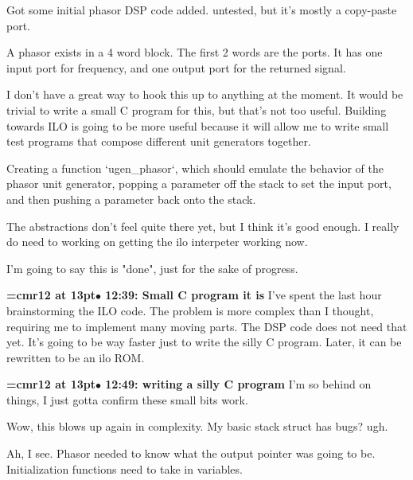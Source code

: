 Got some initial phasor DSP code added. untested, but it's mostly a copy-paste port.
\par

A phasor exists in a 4 word block. The first 2 words are the ports. It has one input port for frequency, and one output port for the returned signal.
\par

I don't have a great way to hook this up to anything at the moment. It would be trivial to write a small C program for this, but that's not too useful. Building towards ILO is going to be more useful because it will allow me to write small test programs that compose different unit generators together.
\par

Creating a function `ugen\_phasor`, which should emulate the behavior of the phasor unit generator, popping a parameter off the stack to set the input port, and then pushing a parameter back onto the stack.
\par

The abstractions don't feel quite there yet, but I think it's good enough. I really do need to working on getting the ilo interpeter working now.
\par

I'm going to say this is "done", just for the sake of progress.
\par

{\smallskip\noindent\bf\font\titlefont=cmr12 at 13pt\titlefont $\bullet$ 12:39: Small C program it is}\smallskip
I've spent the last hour brainstorming the ILO code. The problem is more complex than I thought, requiring me to implement many moving parts. The DSP code does not need that yet. It's going to be way faster just to write the silly C program. Later, it can be rewritten to be an ilo ROM.
\par

{\smallskip\noindent\bf\font\titlefont=cmr12 at 13pt\titlefont $\bullet$ 12:49: writing a silly C program}\smallskip
I'm so behind on things, I just gotta confirm these small bits work.
\par

Wow, this blows up again in complexity. My basic stack struct has bugs? ugh.
\par

Ah, I see. Phasor needed to know what the output pointer was going to be. Initialization functions need to take in variables.
\par


